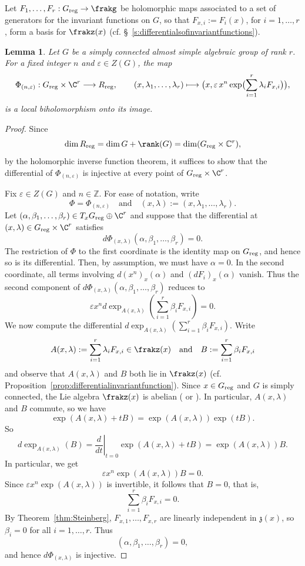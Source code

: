 \documentclass[12pt, a4paper, oneside]{amsart}
\theoremstyle{plain} %
\newtheorem{lemma}[theorem]{Lemma}
\theoremstyle{definition} %
\theoremstyle{remark} %
\begin{document}
Let $F_1,\dots,F_r:G_{\rm reg}\to \frakg$ be holomorphic maps associated to a set of generators for the invariant functions on $G$, so that $F_{x,i}:=F_i(x)$, for $i=1,\dots,r$, form a basis for $\frakz(x)$ (cf. \S~\ref{s:differentialsofinvariantfunctions}).

\begin{lemma}\label{lem:bihol}
Let $G$ be a simply connected almost simple algebraic group of rank $r$. For a fixed integer $n$ and $\varepsilon\in Z(G)$, the map
\[
\Phi_{(n,\varepsilon)}:G_{\mathrm{reg}}\times \C^r \longrightarrow R_{\mathrm{reg}},
\qquad
(x,\lambda_1,\dots,\lambda_r)\longmapsto \bigl(x,\varepsilon \,x^n\exp\bigl(\sum_{i=1}^r\lambda_i F_{x,i}\bigr)\bigr),
\]
is a local biholomorphism onto its image.
\end{lemma}


\begin{proof}
Since
\[ \dim R_{\rm reg}=\dim G+\rank(G) = \dim(G_{\rm reg}\times \mathbb C^r),\]
by the holomorphic inverse function theorem, it suffices to show that
the differential of \(\Phi_{(n,\varepsilon)}\) is injective at every point of $G_{\rm reg}\times \C^r$.

Fix \(\varepsilon\in Z(G)\) and \(n\in\mathbb Z\). For ease of notation, write
\[ \Phi=\Phi_{(n,\varepsilon)}\quad \text{and}\quad (x,\lambda):=(x,\lambda_1,\dots,\lambda_r).\]
Let $(\alpha,\beta_1,\dots,\beta_r)\in T_xG_{\rm reg}\oplus \C^r$ and suppose that the differential at $(x,\lambda)\in G_{\rm reg}\times \C^r$ satisfies
\[
        d\Phi_{(x,\lambda)}(\alpha,\beta_1,\dots,\beta_r)=0.
\]
The restriction of $\Phi$ to the first coordinate is the identity map on \(G_{\rm reg}\), and hence so is its differential. Then, by assumption, we must have $\alpha=0$. In the second coordinate, all terms involving $d(x^n)_x(\alpha)$ and $(dF_{i})_x(\alpha)$ vanish. Thus the second component of $d\Phi_{(x,\lambda)}(\alpha,\beta_1,\dots,\beta_r)$ reduces to
\[\varepsilon x^n d\exp_{A(x,\lambda)}\left(\sum_{i=1}^r \beta_iF_{x,i} \right) = 0.\]
We now compute the differential $d\exp_{A(x,\lambda)}\left(\sum_{i=1}^r \beta_iF_{x,i} \right)$. Write
\[A(x,\lambda):=\sum_{i=1}^r\lambda_iF_{x,i}
\in \frakz(x)\quad \text{and}\quad   B:=\sum_{i=1}^r\beta_iF_{x,i}\]
and observe that $A(x,\lambda)$ and $B$ both lie in $\frakz(x)$ (cf. Proposition~\ref{prop:differentialinvariantfunction}). Since $x\in G_{\rm reg}$ and $G$ is simply connected, the Lie algebra $\frakz(x)$ is abelian (\cite[Remark 3.13]{Ste65} or \cite[Theorem D]{Kur78}). In particular, $A(x,\lambda)$ and $B$ commute, so we have
\[\exp(A(x,\lambda)+tB)=\exp(A(x,\lambda))\exp(tB).\]
So
\[d\exp_{A(x,\lambda)}(B)=\left.\frac{d}{dt}\right|_{t=0}\exp(A(x,\lambda)+tB)= \exp(A(x,\lambda))B.\]
In particular, we get
\[
\varepsilon x^n\exp(A(x,\lambda))B=0.
\]
Since \(\varepsilon x^n\exp(A(x,\lambda))\) is invertible,
it follows that $ B=0$, that is,
\[\sum_{i=1}^r\beta_iF_{x,i}=0.\]
By Theorem~\ref{thm:Steinberg}, $F_{x,1},\dots,F_{x,r}$ are linearly independent in \(\mathfrak z(x)\), so $\beta_i=0$ for all $i=1,\dots,r$.
Thus
\[(\alpha,\beta_1,\dots,\beta_r)=0,\]
and hence $d\Phi_{(x,\lambda)}$ is injective.
\end{proof} 
\end{document}
